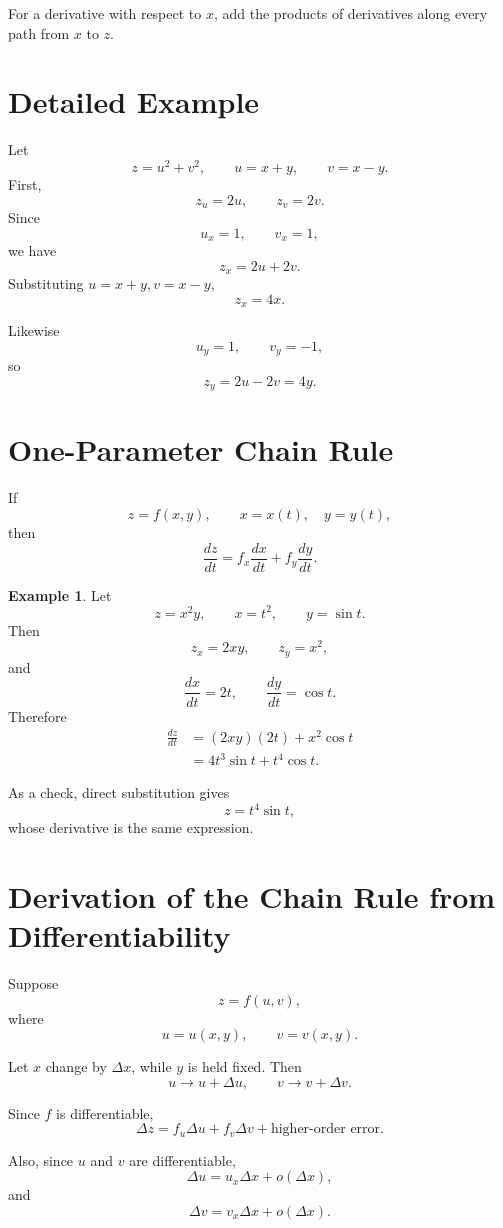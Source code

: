 \documentclass[11pt,oneside]{book}
\theoremstyle{studentthm}
\theoremstyle{definition}
\newtheorem{example}[theorem]{Example}
\begin{document}
For a derivative with respect to \(x\), add the products of
derivatives along every path from \(x\) to \(z\).

\section{Detailed Example}

Let
\[
z=u^2+v^2,
\qquad
u=x+y,
\qquad
v=x-y.
\]
First,
\[
z_u=2u,\qquad z_v=2v.
\]
Since
\[
u_x=1,\qquad v_x=1,
\]
we have
\[
z_x=2u+2v.
\]
Substituting \(u=x+y,v=x-y\),
\[
z_x=4x.
\]

Likewise
\[
u_y=1,\qquad v_y=-1,
\]
so
\[
z_y=2u-2v=4y.
\]

\section{One-Parameter Chain Rule}

If
\[
z=f(x,y),
\qquad
x=x(t),\quad y=y(t),
\]
then
\[
\frac{dz}{dt}
=
f_x\frac{dx}{dt}
+
f_y\frac{dy}{dt}.
\]

\begin{example}
Let
\[
z=x^2y,
\qquad
x=t^2,
\qquad
y=\sin t.
\]
Then
\[
z_x=2xy,\qquad z_y=x^2,
\]
and
\[
\frac{dx}{dt}=2t,
\qquad
\frac{dy}{dt}=\cos t.
\]
Therefore
\[
\begin{aligned}
\frac{dz}{dt}
&=
(2xy)(2t)+x^2\cos t\\
&=
4t^3\sin t+t^4\cos t.
\end{aligned}
\]

As a check, direct substitution gives
\[
z=t^4\sin t,
\]
whose derivative is the same expression.
\end{example}


\section{Derivation of the Chain Rule from Differentiability}

Suppose
\[
z=f(u,v),
\]
where
\[
u=u(x,y),
\qquad
v=v(x,y).
\]

Let \(x\) change by \(\Delta x\), while \(y\) is held fixed. Then
\[
u\to u+\Delta u,
\qquad
v\to v+\Delta v.
\]

Since \(f\) is differentiable,
\[
\Delta z
=
f_u\Delta u
+
f_v\Delta v
+
\text{higher-order error}.
\]

Also, since \(u\) and \(v\) are differentiable,
\[
\Delta u
=
u_x\Delta x
+
o(\Delta x),
\]
and
\[
\Delta v
=
v_x\Delta x
+
o(\Delta x).
\]
\end{document}
